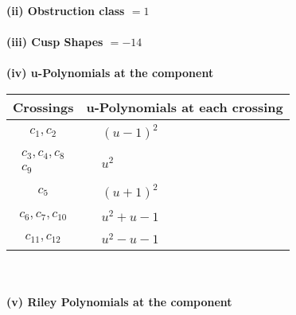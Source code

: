 \documentclass[1p]{elsarticle_modified}
\theoremstyle{definition}
\begin{document}
\flushleft \textbf{(ii) Obstruction class $= 1$}\\~\\
\flushleft \textbf{(iii) Cusp Shapes $= -14$}\\~\\
\newpage\renewcommand{\arraystretch}{1}
\flushleft \textbf{(iv) u-Polynomials at the component}\newline \\
\begin{tabular}{m{50pt}|m{274pt}}
Crossings & \hspace{64pt}u-Polynomials at each crossing \\
\hline $$\begin{aligned}c_{1},c_{2}\end{aligned}$$&$\begin{aligned}
&(u-1)^2
\end{aligned}$\\
\hline $$\begin{aligned}c_{3},c_{4},c_{8}\\c_{9}\end{aligned}$$&$\begin{aligned}
&u^2
\end{aligned}$\\
\hline $$\begin{aligned}c_{5}\end{aligned}$$&$\begin{aligned}
&(u+1)^2
\end{aligned}$\\
\hline $$\begin{aligned}c_{6},c_{7},c_{10}\end{aligned}$$&$\begin{aligned}
&u^2+u-1
\end{aligned}$\\
\hline $$\begin{aligned}c_{11},c_{12}\end{aligned}$$&$\begin{aligned}
&u^2- u-1
\end{aligned}$\\
\hline
\end{tabular}\\~\\
\newpage\renewcommand{\arraystretch}{1}
\flushleft \textbf{(v) Riley Polynomials at the component}\newline \\
\end{document}
